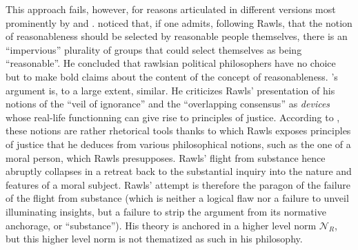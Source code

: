 \documentclass[preprint, french, english, 11pt, authoryear]{elsarticle}%
\begin{document}
This approach fails, however, for reasons articulated in different versions most prominently by \cite{habermas_reconciliation_1995} and \cite{estlund_democratic_2009}. \citet{estlund_democratic_2009} noticed that, if one admits, following Rawls, that the notion of reasonableness should be selected by reasonable people themselves, there is an “impervious” plurality of groups that could select themselves as being “reasonable”. He concluded that rawlsian political philosophers have no choice but to make bold claims about the content of the concept of reasonableness. \cite{habermas_reconciliation_1995}'s argument is, to a large extent, similar. He criticizes Rawls' presentation of his notions of the “veil of ignorance” and the “overlapping consensus” as \emph{devices} whose real-life functionning can give rise to principles of justice. According to \cite{habermas_reconciliation_1995}, these notions are rather rhetorical tools thanks to which Rawls exposes principles of justice that he deduces from various philosophical notions, such as the one of a moral person, which Rawls presupposes. Rawls' flight from substance hence abruptly collapses in a retreat back to the substantial inquiry into the nature and features of a moral subject.  Rawls' attempt is therefore the paragon of the failure of the flight from substance (which is neither a logical flaw nor a failure to unveil illuminating insights, but a failure to strip the argument from its normative anchorage, or “substance”). His theory is anchored in a higher level norm $\mathscr{N}_R$, but this higher level norm is not thematized as such in his philosophy.
\end{document}
